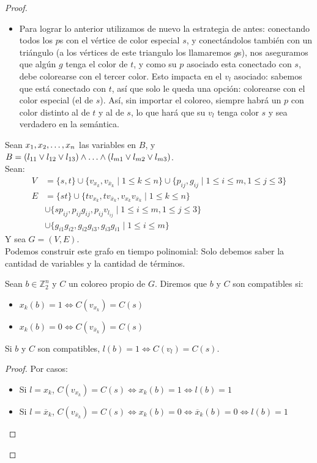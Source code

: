 \begin{proof}
\begin{itemize}
    \item Para lograr lo anterior utilizamos de nuevo la estrategia de antes: conectando todos los $p$s con el vértice de color especial $s$, y conectándolos también con un triángulo (a los vértices de este triangulo los llamaremos $g$s), nos aseguramos que algún $g$ tenga el color de $t$, y como su $p$ asociado esta conectado con $s$, debe colorearse con el tercer color. Esto impacta en el $v_l$ asociado: sabemos que está conectado con $t$, así que solo le queda una opción: colorearse con el color especial (el de $s$). Así, sin importar el coloreo, siempre habrá un $p$ con color distinto al de $t$ y al de $s$, lo que hará que su $v_l$ tenga color $s$ y sea verdadero en la semántica.
\end{itemize}
Sean $x_1, x_2, \mathellipsis, x_n$ las variables en $B$, y  $B = (l_{11} \vee l_{12} \vee l_{13}) \wedge \mathellipsis \wedge (l_{m1} \vee l_{m2} \vee l_{m3})$.\\
Sean:
\begin{align}
    V &= \{ s, t \} \cup \{ v_{x_k}, v_{\overline{x}_k} \mid 1 \le k \le n \} \cup \{ p_{ij}, g_{ij} \mid 1 \le i \le m, 1 \le j \le 3 \}\\
    E &= \{ st \}
        \cup \{ tv_{x_k}, tv_{\overline{x}_k}, v_{x_k}v_{\overline{x}_k} \mid 1 \le k \le n \}\\
        &\cup \{ sp_{ij}, p_{ij}g_{ij}, p_{ij}v_{l_{ij}}
        \mid 1 \le i \le m, 1 \le j \le 3 \}\\
        &\cup \{ g_{i1}g_{i2}, g_{i2}g_{i3}, g_{i3}g_{i1} \mid 1 \le i \le m \}
\end{align}
Y sea $G = (V, E)$.\\
Podemos construir este grafo en tiempo polinomial: Solo debemos saber la cantidad de variables y la cantidad de términos.\\
\begin{definition}
Sean $b \in \mathbb{Z}_2^n$ y $C$ un coloreo propio de $G$. Diremos que $b$ y $C$ son compatibles si:
\begin{itemize}
    \item $x_k(b) = 1 \iff C(v_{x_k}) = C(s)$
    \item $x_k(b) = 0 \iff C(v_{\overline{x}_k}) = C(s)$
\end{itemize}
\end{definition}

\begin{proposition}
Si $b$ y $C$ son compatibles, $l(b) = 1 \iff C(v_l) = C(s)$.
\end{proposition}
\begin{proof}
Por casos:
\begin{itemize}
    \item Si $l = x_k$, $C(v_{x_k}) = C(s) \iff x_k(b) = 1 \iff l(b) = 1$
    \item Si $l = \overline{x}_k$, $C(v_{\overline{x}_k}) = C(s) \iff x_k(b) = 0 \iff \overline{x}_k(b) = 0 \iff l(b) = 1$
\end{itemize}
\end{proof}


\end{proof}
